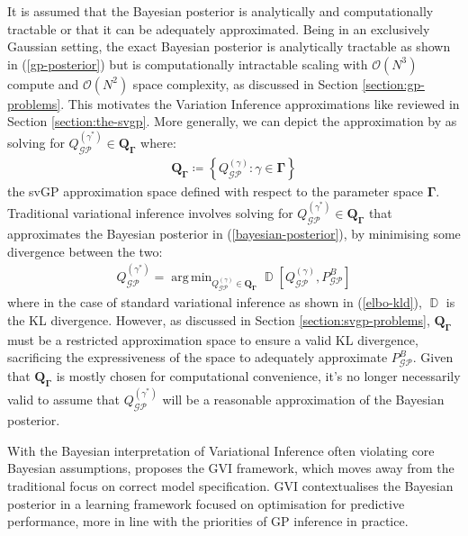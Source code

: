 \documentclass{article}
\newcommand{\D}{\operatorname{\mathbb{D}}}
\newcommand{\GP}{\operatorname{\mathcal{GP}}}
\DeclareMathOperator*{\argmin}{arg\,min}
\numberwithin{equation}{section}
\begin{document}
It is assumed that the Bayesian posterior is analytically and computationally tractable or that it can be adequately approximated. Being in an exclusively Gaussian setting, the exact Bayesian posterior is analytically tractable as shown in (\ref{gp-posterior}) but is computationally intractable scaling with $\mathcal{O}(N^3)$ compute and $\mathcal{O}(N^2)$ space complexity, as discussed in Section \ref{section:gp-problems}. This motivates the Variation Inference approximations like \cite{titsias2009variational} reviewed in Section \ref{section:the-svgp}. More generally, we can depict the approximation by \cite{titsias2009variational} as solving for $Q_{\GP}^{(\gamma^*)} \in \boldsymbol{Q}_{\mathbf{\Gamma}}$ where:
\begin{align}
    \boldsymbol{Q}_{\boldsymbol{\Gamma}} \coloneqq \left\{Q_{\GP}^{(\gamma)}: \gamma \in \mathbf{\Gamma}\right\}
    \label{svgp-space}
\end{align}
the svGP approximation space defined with respect to the parameter space $\mathbf{\Gamma}$. Traditional variational inference involves solving for $Q_{\GP}^{(\gamma^*)} \in \boldsymbol{Q}_{\boldsymbol{\Gamma}}$ that approximates the Bayesian posterior in (\ref{bayesian-posterior}), by minimising some divergence between the two: 
\begin{align}
Q^{(\gamma^*)}_{\GP} = \argmin_{Q^{(\gamma)}_{\GP} \in \boldsymbol{Q}_{\boldsymbol{\Gamma}}}\D\left[Q_{\GP}^{(\gamma)}, P_{\GP}^B\right]
\end{align}
where in the case of standard variational inference as shown in (\ref{elbo-kld}), $\D$ is the KL divergence.
However, as discussed in Section \ref{section:svgp-problems}, $\boldsymbol{Q}_{\boldsymbol{\Gamma}}$ must be a restricted approximation space to ensure a valid KL divergence, sacrificing the expressiveness of the space to adequately approximate $P_{\GP}^B$. Given that $\boldsymbol{Q}_{\boldsymbol{\Gamma}}$ is mostly chosen for computational convenience, it's no longer necessarily valid to assume that $Q_{\GP}^{(\gamma^*)}$ will be a reasonable approximation of the Bayesian posterior.

With the Bayesian interpretation of Variational Inference often violating core Bayesian assumptions, \cite{knoblauch2022optimization} proposes the GVI framework, which moves away from the traditional focus on correct model specification. GVI contextualises the Bayesian posterior in a learning framework focused on optimisation for predictive performance, more in line with the priorities of GP inference in practice.
\end{document}
